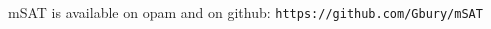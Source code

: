 \documentclass[portrait,a0,final]{a0poster}
\def\msat{\textsf{mSAT}}
\def\opam{\textsf{opam}}
\begin{document}
\begin{center}
\begin{multicols}{2}
\end{multicols}


\Large \msat{} is available on \opam{} and on github: \texttt{https://github.com/Gbury/mSAT}

\end{center}
\end{document}
